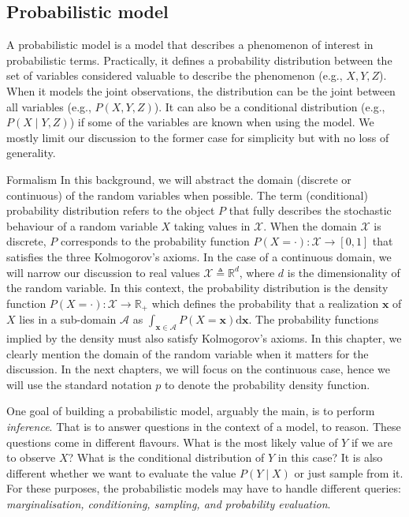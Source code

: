 \subsection{Probabilistic model}
A probabilistic model is a model that describes a phenomenon of interest in probabilistic terms. Practically, it defines a probability distribution between the set of variables considered valuable to describe the phenomenon (e.g., $X, Y, Z$). When it models the joint observations, the distribution can be the joint between all variables (e.g., $P(X, Y, Z)$). It can also be a conditional distribution  (e.g., $P(X \mid Y, Z)$) if some of the variables are known when using the model. We mostly limit our discussion to the former case for simplicity but with no loss of generality.

\begin{side_note}{Formalism}
  In this background, we will abstract the domain (discrete or continuous) of the random variables when possible. The term (conditional) probability distribution refers to the object $P$ that fully describes the stochastic behaviour of a random variable $X$ taking values in $\mathcal{X}$. When the domain $\mathcal{X}$ is discrete, $P$ corresponds to the probability function $P(X=\cdot): \mathcal{X} \rightarrow \left[0, 1 \right]$ that satisfies the three Kolmogorov's axioms. In the case of a continuous domain, we will narrow our discussion to real values $\mathcal{X} \triangleq \mathbb{R}^d$, where $d$ is the dimensionality of the random variable. In this context, the probability distribution is the density function $P(X=\cdot): \mathcal{X} \rightarrow \mathbb{R}_{+}$ which defines the probability that a realization $\bm{x}$ of $X$ lies in a sub-domain $\mathcal{A}$ as $\int_{\bm{x} \in \mathcal{A}} P(X=\bm{x}) \text{d} \bm{x}$. The probability functions implied by the density must also satisfy Kolmogorov's axioms. In this chapter, we clearly mention the domain of the random variable when it matters for the discussion. In the next chapters, we will focus on the continuous case, hence we will use the standard notation $p$ to denote the probability density function.
\end{side_note}

One goal of building a probabilistic model, arguably the main, is to perform \textit{inference}. That is to answer questions in the context of a model, to reason. These questions come in different flavours. What is the most likely value of $Y$ if we are to observe $X$? What is the conditional distribution of $Y$ in this case? It is also different whether we want to evaluate the value $P(Y \mid X)$ or just sample from it. For these purposes, the probabilistic models may have to handle different queries: \textit{marginalisation, conditioning, sampling, and probability evaluation}.

